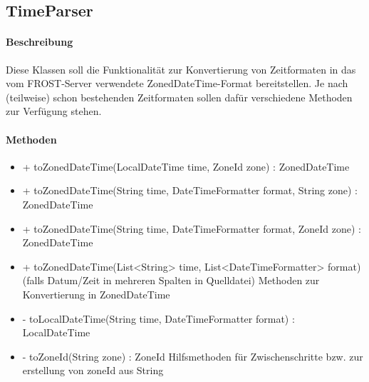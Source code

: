 \subsection{TimeParser}

\paragraph{Beschreibung}
Diese Klassen soll die Funktionalität zur Konvertierung von Zeitformaten in das vom FROST-Server verwendete ZonedDateTime-Format bereitstellen.
Je nach (teilweise) schon bestehenden Zeitformaten sollen dafür verschiedene Methoden zur Verfügung stehen.

\paragraph{Methoden}

\begin{itemize}
\item + toZonedDateTime(LocalDateTime time, ZoneId zone) : ZonedDateTime
\item + toZonedDateTime(String time, DateTimeFormatter format, String zone) : ZonedDateTime
\item + toZonedDateTime(String time, DateTimeFormatter format, ZoneId zone) : ZonedDateTime
\item + toZonedDateTime(List<String> time, List<DateTimeFormatter> format)(falls Datum/Zeit in mehreren Spalten in Quelldatei)
Methoden zur Konvertierung in ZonedDateTime
\item - toLocalDateTime(String time, DateTimeFormatter format) : LocalDateTime
\item - toZoneId(String zone) : ZoneId
Hilfsmethoden für Zwischenschritte bzw. zur erstellung von zoneId aus String
\end{itemize}